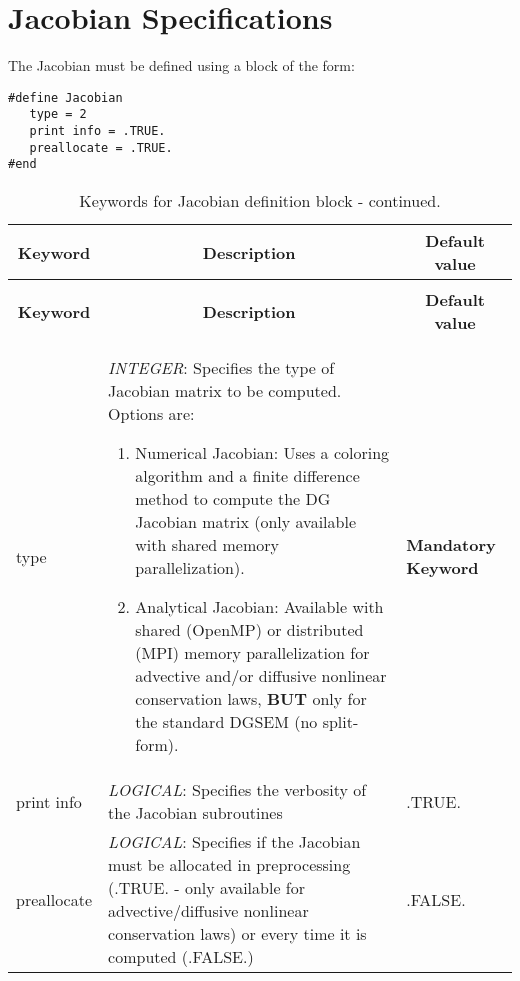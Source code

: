 \documentclass[a4paper,10pt]{report}
\begin{document}
\section{Jacobian Specifications}
The Jacobian must be defined using a block of the form:
\begin{lstlisting}
#define Jacobian
   type = 2
   print info = .TRUE.
   preallocate = .TRUE.
#end
\end{lstlisting}

\begin{longtable}{|p{4cm}|p{10cm}|p{2.2cm}|}
\caption{Keywords for Jacobian definition block.} \label{tab:Jacobiankey} \\
\hline
\multicolumn{1}{|c|}{\textbf{Keyword}} & \multicolumn{1}{c|}{\textbf{Description}} & \multicolumn{1}{c|}{\textbf{Default value}} \\ \hline
\endfirsthead

\caption{Keywords for Jacobian definition block - continued.} \\
\hline
\multicolumn{1}{|c|}{\textbf{Keyword}} & \multicolumn{1}{c|}{\textbf{Description}} & \multicolumn{1}{c|}{\textbf{Default value}} \\ \hline
\endhead


type             & \textit{INTEGER}: Specifies the type of Jacobian matrix to be computed. Options are:\
				\begin{enumerate}
					\item Numerical Jacobian: Uses a coloring algorithm and a finite difference method to compute the DG Jacobian matrix (only available with shared memory parallelization).
					\item Analytical Jacobian: Available with shared (OpenMP) or distributed (MPI) memory parallelization for advective and/or diffusive nonlinear conservation laws, \textbf{BUT} only for the standard DGSEM (no split-form).
					\end{enumerate}
										& \textbf{Mandatory Keyword} \\ \hline

print info      & \textit{LOGICAL}: Specifies the verbosity of the Jacobian subroutines  & .TRUE. \\ \hline

preallocate     & \textit{LOGICAL}: Specifies if the Jacobian must be allocated in preprocessing (.TRUE. - only available for advective/diffusive nonlinear conservation laws) or every time it is computed (.FALSE.)  & .FALSE. \\ \hline

\end{longtable}
\end{document}
